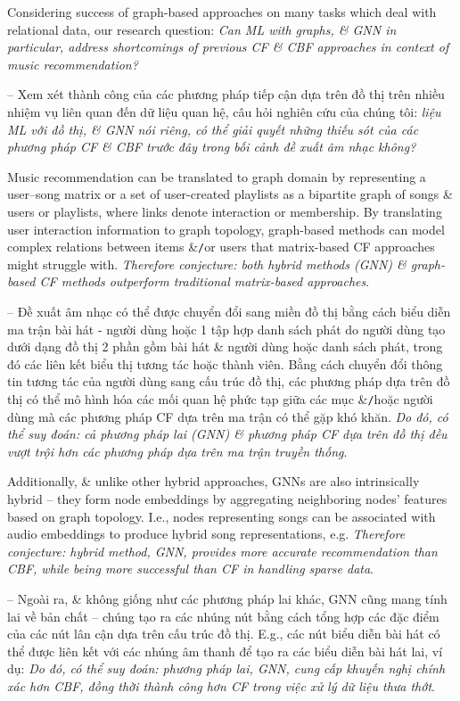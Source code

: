 \documentclass{article}
\begin{document}
\begin{itemize}
    Considering success of graph-based approaches on many tasks which deal with relational data, our research question: {\it Can ML with graphs, \& GNN in particular, address shortcomings of previous CF \& CBF approaches in context of music recommendation?}

    -- Xem xét thành công của các phương pháp tiếp cận dựa trên đồ thị trên nhiều nhiệm vụ liên quan đến dữ liệu quan hệ, câu hỏi nghiên cứu của chúng tôi: {\it liệu ML với đồ thị, \& GNN nói riêng, có thể giải quyết những thiếu sót của các phương pháp CF \& CBF trước đây trong bối cảnh đề xuất âm nhạc không?}

    Music recommendation can be translated to graph domain by representing a user--song matrix or a set of user-created playlists as a bipartite graph of songs \& users or playlists, where links denote interaction or membership. By translating user interaction information to graph topology, graph-based methods can model complex relations between items \&{\tt/}or users that matrix-based CF approaches might struggle with. {\it Therefore conjecture: both hybrid methods (GNN) \& graph-based CF methods outperform traditional matrix-based approaches}.

    -- Đề xuất âm nhạc có thể được chuyển đổi sang miền đồ thị bằng cách biểu diễn ma trận bài hát - người dùng hoặc 1 tập hợp danh sách phát do người dùng tạo dưới dạng đồ thị 2 phần gồm bài hát \& người dùng hoặc danh sách phát, trong đó các liên kết biểu thị tương tác hoặc thành viên. Bằng cách chuyển đổi thông tin tương tác của người dùng sang cấu trúc đồ thị, các phương pháp dựa trên đồ thị có thể mô hình hóa các mối quan hệ phức tạp giữa các mục \&{\tt/}hoặc người dùng mà các phương pháp CF dựa trên ma trận có thể gặp khó khăn. {\it Do đó, có thể suy đoán: cả phương pháp lai (GNN) \& phương pháp CF dựa trên đồ thị đều vượt trội hơn các phương pháp dựa trên ma trận truyền thống}.

    Additionally, \& unlike other hybrid approaches, GNNs are also intrinsically hybrid -- they form node embeddings by aggregating neighboring nodes' features based on graph topology. I.e., nodes representing songs can be associated with audio embeddings to produce hybrid song representations, e.g. {\it Therefore conjecture: hybrid method, GNN, provides more accurate recommendation than CBF, while being more successful than CF in handling sparse data}.

    -- Ngoài ra, \& không giống như các phương pháp lai khác, GNN cũng mang tính lai về bản chất -- chúng tạo ra các nhúng nút bằng cách tổng hợp các đặc điểm của các nút lân cận dựa trên cấu trúc đồ thị. E.g., các nút biểu diễn bài hát có thể được liên kết với các nhúng âm thanh để tạo ra các biểu diễn bài hát lai, ví dụ: {\it Do đó, có thể suy đoán: phương pháp lai, GNN, cung cấp khuyến nghị chính xác hơn CBF, đồng thời thành công hơn CF trong việc xử lý dữ liệu thưa thớt}.


\end{itemize}
\end{document}
